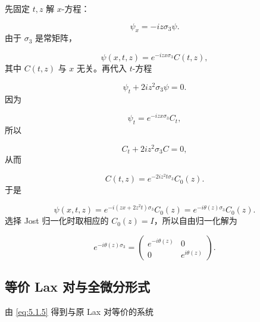 \documentclass[
    lang=cn,
    scheme=chinese,
    mode=simple,
    device=normal,
    color=blue,
    math=cm,
    thmcnt=section,
    12pt,
    nowatermark
]{elegantbook}
\begin{document}
\begin{callout}[计算：这个自由基本解是怎样求出来的？]
    先固定 $t,z$ 解 $x$-方程：

    \[
        \psi_x=-iz\sigma_3\psi.
    \]
    由于 $\sigma_3$ 是常矩阵，

    \[
        \psi(x,t,z)
        =
        e^{-izx\sigma_3}C(t,z),
    \]
    其中 $C(t,z)$ 与 $x$ 无关。再代入 $t$-方程

    \[
        \psi_t+2iz^2\sigma_3\psi=0.
    \]
    因为

    \[
        \psi_t=e^{-izx\sigma_3}C_t,
    \]
    所以

    \[
        C_t+2iz^2\sigma_3C=0,
    \]
    从而

    \[
        C(t,z)
        =
        e^{-2iz^2t\sigma_3}C_0(z).
    \]
    于是

    \[
        \psi(x,t,z)
        =
        e^{-i(zx+2z^2t)\sigma_3}C_0(z)
        =
        e^{-i\theta(z)\sigma_3}C_0(z).
    \]
    选择 Jost 归一化时取相应的 $C_0(z)=I$，所以自由归一化解为

    \[
        e^{-i\theta(z)\sigma_3}
        =
        \begin{pmatrix}
            e^{-i\theta(z)} & 0              \\
            0               & e^{i\theta(z)}
        \end{pmatrix}.
    \]

\end{callout}




\subsection{等价 Lax 对与全微分形式}

由 \eqref{eq:5.1.5} 得到与原 Lax 对等价的系统
\end{document}
